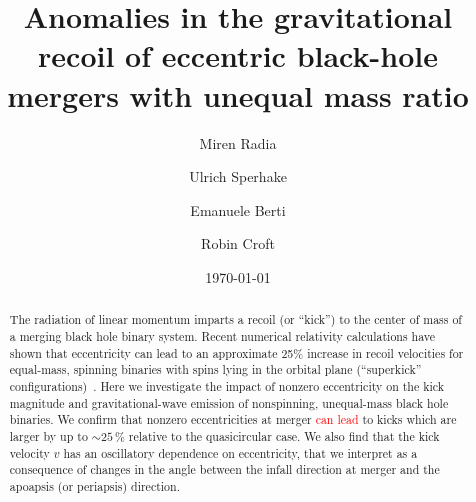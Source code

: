 \documentclass[floats,floatfix,showpacs,amssymb,prd,twocolumn,superscriptaddress,nofootinbib,nolongbibliography,reprint]{revtex4-2}
\newcommand{\new}[1]{{\textcolor{red}{ #1} }}
\begin{document}
\title{Anomalies in the gravitational recoil of eccentric black-hole mergers with unequal mass ratio}

\author{Miren Radia}

\author{Ulrich Sperhake}

\author{Emanuele Berti}

\author{Robin Croft}

\date{\today}

\begin{abstract}
  The radiation of linear momentum imparts a recoil (or ``kick'') to
  the center of mass of a merging black hole binary system. Recent
  numerical relativity calculations have shown that
  eccentricity can lead to an approximate 25\% increase in recoil
  velocities for equal-mass, spinning binaries with spins lying in the
  orbital plane (``superkick'' configurations)~.
  Here we investigate the impact of nonzero eccentricity on the kick
  magnitude and gravitational-wave emission of nonspinning,
  unequal-mass black hole binaries. We confirm that nonzero
  eccentricities at merger \new{can lead} to kicks which are larger by
  up to $\sim 25\,\%$ relative to the quasicircular case.
  We also find that the kick velocity $v$ has an oscillatory
  dependence on eccentricity, that we interpret as a consequence of
  changes in the angle between the infall direction at merger and the
  apoapsis (or periapsis) direction.
\end{abstract}

\maketitle
\end{document}
